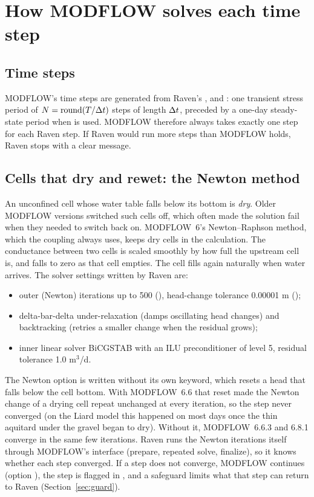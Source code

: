 \section{How MODFLOW solves each time step}\label{ch:mf6}
\subsection{Time steps}
MODFLOW's time steps are generated from Raven's ,  and : one transient
stress period of $N=\mathrm{round}(T/\Delta t)$ steps of length $\Delta t$, preceded by a one-day steady-state period when
 is used. MODFLOW therefore always takes exactly one step for each Raven step.
If Raven would run more steps than MODFLOW holds, Raven stops with a clear message.

\subsection{Cells that dry and rewet: the Newton method}
An unconfined cell whose water table falls below its bottom is \emph{dry}. Older MODFLOW versions switched such cells
off, which often made the solution fail when they needed to switch back on. MODFLOW~6's Newton--Raphson method, which the coupling always uses, keeps dry cells in the calculation. The conductance
between two cells is scaled smoothly by how full the upstream cell is, and falls to zero as that cell empties. The cell
fills again naturally when water arrives. The solver settings written by Raven are:
\begin{itemize}
\item outer (Newton) iterations up to 500 (), head-change tolerance 0.00001 m ();
\item delta-bar-delta under-relaxation (damps oscillating head changes) and backtracking (retries a smaller change
when the residual grows);
\item inner linear solver BiCGSTAB with an ILU preconditioner of level 5, residual tolerance 1.0 m$^3$/d.
\end{itemize}
The Newton option is written without its own  keyword, which resets a head that falls below the cell
bottom. With MODFLOW~6.6 that reset made the Newton change of a drying cell repeat unchanged at every iteration, so the
step never converged (on the Liard model this happened on most days once the thin aquitard under the gravel began to dry).
Without it, MODFLOW~6.6.3 and 6.8.1 converge in the same few iterations.
Raven runs the Newton iterations itself through MODFLOW's interface (prepare, repeated solve, finalize), so it knows
whether each step converged. If a step does not converge, MODFLOW continues (option ), the step is
flagged in , and a safeguard limits what that step can return to Raven (Section~\ref{sec:guard}).

